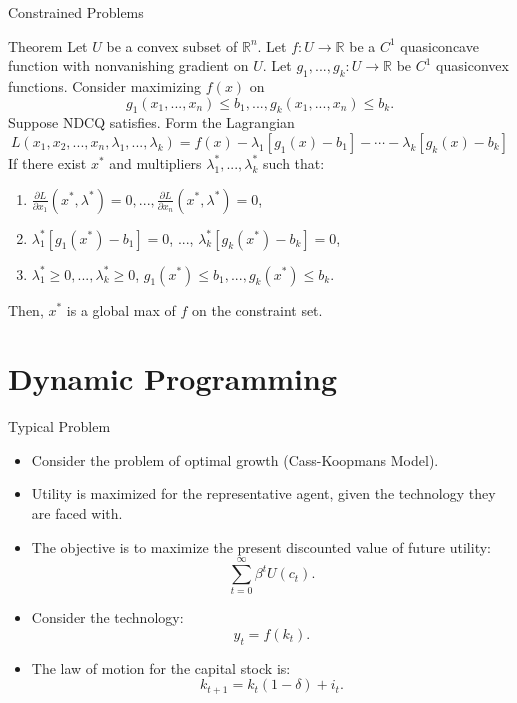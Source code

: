 \documentclass{beamer}
\begin{document}
\begin{frame}{Constrained Problems}
    \begin{block}{Theorem}
        Let $U$ be a convex subset of $\mathbb{R}^n$. Let $f:U\to \mathbb{R}$ be a $C^1$ quasiconcave  function with nonvanishing gradient on $U$. Let $g_1,..., g_k:U\to \mathbb{R}$ be $C^1$ quasiconvex functions. Consider maximizing $f(x)$ on 
          \[g_1(x_1,..., x_n)\leq b_1,..., g_k(x_1,..., x_n)\leq b_k.
    \]
    Suppose NDCQ satisfies. Form the Lagrangian
   \[L(x_1,x_2,..., x_n,\lambda_1,..., \lambda_k)= f(x)-\lambda_1 [g_1(x)-b_1]-\cdots-\lambda_k[g_k(x)-b_k]\]
    If there exist $x^*$ and multipliers $\lambda_1^*,...,\lambda_k^*$ such that:
    \begin{enumerate}
        \item $\frac{\partial L}{\partial x_1}(x^*,  \lambda^*)=0,...,\frac{\partial L}{\partial x_n}(x^*,  \lambda^*)=0$, 
        \item $\lambda_1^*[g_1(x^*)-b_1]=0$, ..., $\lambda_k^*[g_k(x^*)-b_k]=0$,
        
        \item $\lambda_1^*\geq 0,..., \lambda_k^*\geq 0$, $g_1(x^*)\leq b_1,..., g_k(x^*)\leq b_k$.
    \end{enumerate}
    Then, $x^*$ is a global max of $f$ on the constraint set.
    \end{block}
\end{frame}



\section{Dynamic Programming }
\begin{frame}{Typical Problem }
    \begin{itemize}
        \item Consider the problem of optimal growth (Cass-Koopmans Model). 
        \item Utility is maximized for the representative agent, given the technology they are faced with. 
        \item The objective is to maximize the present discounted value of future utility:
        \[\sum_{t=0}^\infty \beta^t U(c_t).
        \]
        \item Consider the technology:
        \[y_t=f(k_t).
        \]
        \item The law of motion for the capital stock is:
        \[k_{t+1}=k_t(1-\delta)+i_t.
        \]
    \end{itemize}
        
\end{frame}
\end{document}
